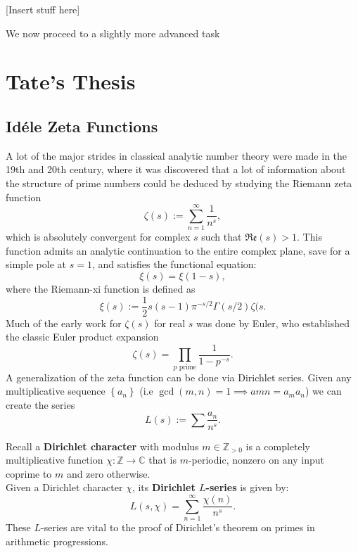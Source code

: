 \documentclass[11pt, x11names]{book}
\newcommand{\zz}{\mathbb{Z}}
\newcommand{\cc}{\mathbb{C}}
\newcommand{\set}[1]{\left\{ #1 \right\}}
\newcommand{\re}[1]{\mathfrak{Re} \left( #1 \right)}
\begin{document}
[Insert stuff here]

We now proceed to a slightly more advanced task


\newpage

\chapter{Tate's Thesis}

\newpage


\section{Id\'ele Zeta Functions}
\label{section: Id\'ele Zeta Functions}
A lot of the major strides in classical analytic number theory were made in the 19th and 20th century, where it was discovered that a lot of information about the structure of prime numbers could be deduced by studying the Riemann zeta function
\begin{equation*}
    \zeta(s) := \sum^\infty_{n=1} \frac{1}{n^s},
\end{equation*}
which is absolutely convergent for complex $s$ such that $\re{s} > 1$. This function admits an analytic continuation to the entire complex plane, save for a simple pole at $s=1$, and satisfies the functional equation:
\begin{equation*}
    \xi(s) = \xi(1-s),
\end{equation*}
where the Riemann-xi function is defined as
\begin{equation*}
    \xi(s) := \frac{1}{2}s(s-1)\pi^{-s/2} \Gamma(s/2) \zeta(s.
\end{equation*}
Much of the early work for $\zeta(s)$ for real $s$ was done by Euler, who established the classic Euler product expansion
\begin{equation*}
    \zeta(s) = \prod_{p \text{ prime}} \frac{1}{1-p^{-s}}.
\end{equation*}
A generalization of the zeta function can be done via Dirichlet series. Given any multiplicative sequence $\set{a_n}$ (i.e $\gcd(m, n) = 1 \implies a{mn} = a_ma_n$) we can create the series 
\begin{equation*}
    L(s) := \sum \frac{a_n}{n^s}.
\end{equation*}

\begin{example}
\label{example: Dirichlet L-func}
    Recall a \textbf{Dirichlet character} with modulus $m \in \zz_{> 0}$ is a completely multiplicative function $\chi: \zz \to \cc$ that is $m$-periodic, nonzero on any input coprime to $m$ and zero otherwise.\\
    Given a Dirichlet character $\chi$, its \textbf{Dirichlet $L$-series} is given by:
    \begin{equation*}
        L(s, \chi) = \sum^\infty_{n=1} \frac{\chi(n)}{n^s}.
    \end{equation*}
    These $L$-series are vital to the proof of Dirichlet's theorem on primes in arithmetic progressions.
\end{example}
\end{document}
